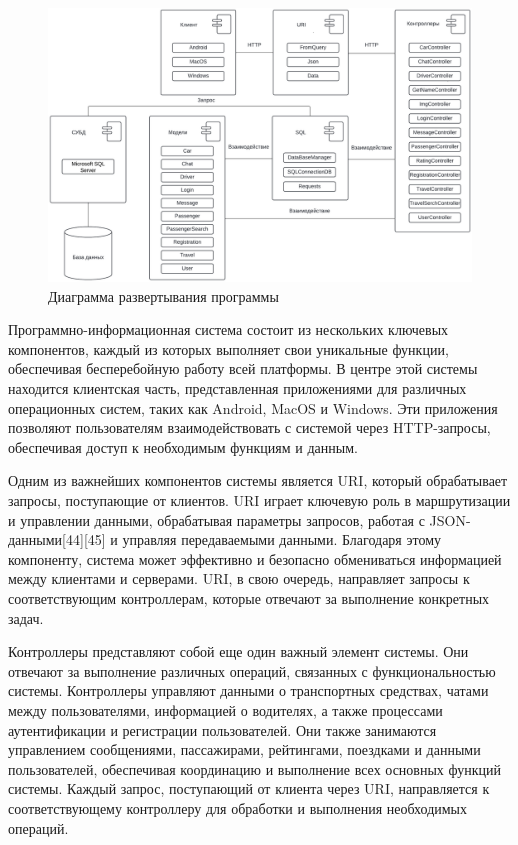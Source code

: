 \begin{figure}[H]
	\centering
	\includegraphics[width=0.9\linewidth]{images/diagramArch}
	\caption{Диаграмма развертывания программы}
	\label{fig:diagramarch}
\end{figure}

Программно-информационная система состоит из нескольких ключевых компонентов, каждый из которых выполняет свои уникальные функции, обеспечивая бесперебойную работу всей платформы. В центре этой системы находится клиентская часть, представленная приложениями для различных операционных систем, таких как Android, MacOS и Windows. Эти приложения позволяют пользователям взаимодействовать с системой через HTTP-запросы, обеспечивая доступ к необходимым функциям и данным.

Одним из важнейших компонентов системы является URI, который обрабатывает запросы, поступающие от клиентов. URI играет ключевую роль в маршрутизации и управлении данными, обрабатывая параметры запросов, работая с JSON-данными[{44}][{45}] и управляя передаваемыми данными. Благодаря этому компоненту, система может эффективно и безопасно обмениваться информацией между клиентами и серверами. URI, в свою очередь, направляет запросы к соответствующим контроллерам, которые отвечают за выполнение конкретных задач.

Контроллеры представляют собой еще один важный элемент системы. Они отвечают за выполнение различных операций, связанных с функциональностью системы. Контроллеры управляют данными о транспортных средствах, чатами между пользователями, информацией о водителях, а также процессами аутентификации и регистрации пользователей. Они также занимаются управлением сообщениями, пассажирами, рейтингами, поездками и данными пользователей, обеспечивая координацию и выполнение всех основных функций системы. Каждый запрос, поступающий от клиента через URI, направляется к соответствующему контроллеру для обработки и выполнения необходимых операций.

